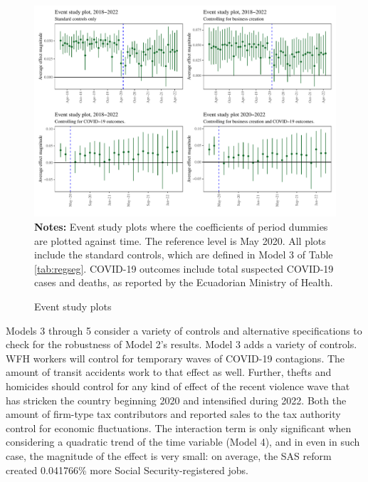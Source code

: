 \documentclass[11pt,a4paper]{article}\usepackage[]{graphicx}\usepackage[]{xcolor}
\makeatletter
\def\maxwidth{ %
  \ifdim\Gin@nat@width>\linewidth
    \linewidth
  \else
    \Gin@nat@width
  \fi
}
\newenvironment{knitrout}{}{} %
\makeatother
\begin{document}
\begin{figure}[htbp!]
\caption{Event study plots}
\label{fig:event}
\begin{knitrout}
\color{fgcolor}
\includegraphics[width=\maxwidth]{figure/event-study-1} 
\end{knitrout}
\textbf{Notes:} Event study plots where the coefficients of period dummies are plotted against time. The reference level is May 2020. All plots include the standard controls, which are defined in Model 3 of Table \ref{tab:regseg}. COVID-19 outcomes include total suspected COVID-19 cases and deaths, as reported by the Ecuadorian Ministry of Health.
\end{figure}

Models 3 through 5 consider a variety of controls and alternative specifications to check for the robustness of Model 2's results. Model 3 adds a variety of controls. WFH workers will control for temporary waves of COVID-19 contagions. The amount of transit accidents work to that effect as well. Further, thefts and homicides should control for any kind of effect of the recent violence wave that has stricken the country beginning 2020 and intensified during 2022. Both the amount of firm-type tax contributors and reported sales to the tax authority control for economic fluctuations. The interaction term is only significant when considering a quadratic trend of the time variable (Model 4), and in even in such case, the magnitude of the effect is very small: on average, the SAS reform created 0.041766\% more Social Security-registered jobs. 
\end{document}
